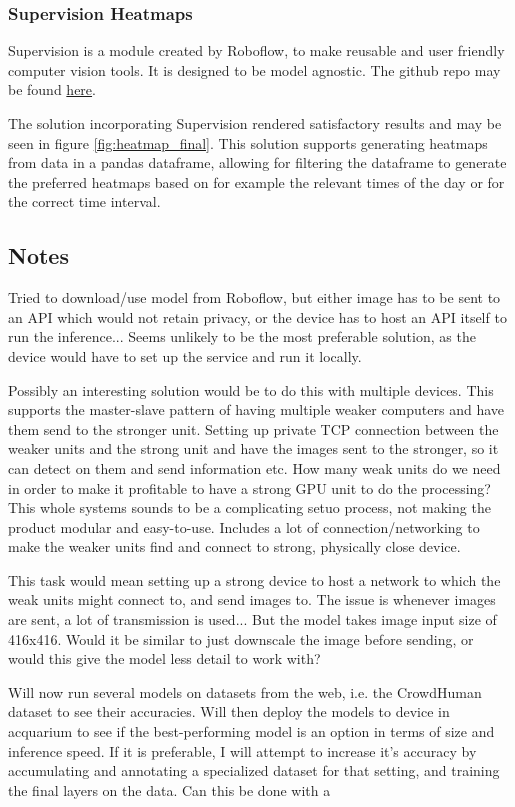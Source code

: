 \subsubsection{Supervision Heatmaps}
Supervision is a module created by Roboflow, to make reusable and user friendly computer vision tools. It is designed to be model agnostic. The github repo may be found \href{https://github.com/roboflow/supervision}{here}.

The solution incorporating Supervision rendered satisfactory results and may be seen in figure \ref{fig:heatmap_final}. This solution supports generating heatmaps from data in a pandas dataframe, allowing for filtering the dataframe to generate the preferred heatmaps based on for example the relevant times of the day or for the correct time interval.

\subsection*{Notes}

Tried to download/use model from Roboflow, but either image has to be sent to an API which would not retain privacy, or the device has to host an API itself to run the inference... Seems unlikely to be the most preferable solution, as the device would have to set up the service and run it locally. 

Possibly an interesting solution would be to do this with multiple devices. This supports the master-slave pattern of having multiple weaker computers and have them send to the stronger unit. 
Setting up private TCP connection between the weaker units and the strong unit and have the images sent to the stronger, so it can detect on them and send information etc. How many weak units do we need in order to make it profitable to have a strong GPU unit to do the processing? This whole systems sounds to be a complicating setuo process, not making the product modular and easy-to-use. Includes a lot of connection/networking to make the weaker units find and connect to strong, physically close device.

This task would mean setting up a strong device to host a network to which the weak units might connect to, and send images to. The issue is whenever images are sent, a lot of transmission is used... But the model takes image input size of 416x416. Would it be similar to just downscale the image before sending, or would this give the model less detail to work with?

Will now run several models on datasets from the web, i.e. the CrowdHuman dataset to see their accuracies. Will then deploy the models to device in acquarium to see if the best-performing model is an option in terms of size and inference speed. If it is preferable, I will attempt to increase it's accuracy by accumulating and annotating a specialized dataset for that setting, and training the final layers on the data. Can this be done with a



